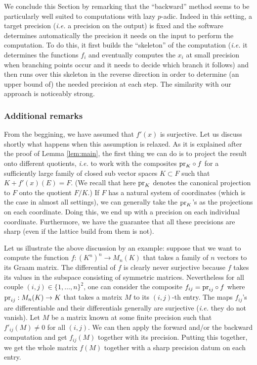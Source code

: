 \documentclass{lms}
\begin{document}
We conclude this Section by remarking that the ``backward'' method seems 
to be particularly well suited to computations with lazy $p$-adic. Indeed 
in this setting, a target precision (\emph{i.e.} a precision on the 
output) is fixed and the software determines automatically the precision 
it needs on the input to perform the computation. To do this, it first 
builds the ``skeleton'' of the computation (\emph{i.e.} it determines the 
functions $f_i$ and eventually computes the $x_i$ at small precision when 
branching points occur and it needs to decide which branch it follows) 
and then runs over this skeleton in the reverse direction in order to 
determine (an upper bound of) the needed precision at each step. The 
similarity with our approach is noticeably strong.

\subsubsection*{Additional remarks}

From the beggining, we have assumed that $f'(x)$ is surjective. Let us 
discuss shortly what happens when this assumption is relaxed. As it is 
explained after the proof of Lemma \ref{lem:main}, the first thing we 
can do is to project the result onto different quotients, \emph{i.e.} to 
work with the composites $\text{\rm pr}_K \circ f$ for a sufficiently large family 
of closed sub vector spaces $K \subset F$ such that $K + f'(x)(E) = F$. 
(We recall that here $\text{\rm pr}_K$ denotes the canonical projection to $F$ 
onto the quotient $F/K$.) If $F$ has a natural system of coordinates 
(which is the case in almost all settings), we can generally take the 
$\text{\rm pr}_K$'s as the projections on each coordinate. Doing this, we end up 
with a precision on each individual coordinate. Furthermore, we have the 
guarantee that all these precisions are sharp (even if the lattice build
from them is not).

Let us illustrate the above discussion by an example: suppose that we 
want to compute the function $f : (K^n)^n \to M_n(K)$ that takes a 
family of $n$ vectors to its Graam matrix. The differential of $f$ is
clearly never surjective because $f$ takes its values in the subspace
consisting of symmetric matrices. Nevertheless for all couple $(i,j)
\in \{1, \ldots, n\}^2$, one can consider the composite $f_{ij} = 
\text{\rm pr}_{ij} \circ f$ where $\text{\rm pr}_{ij} : M_n(K) \to K$ that takes a matrix 
$M$ to its $(i,j)$-th entry. The maps $f_{ij}$'s are differentiable and 
their differentials generally are surjective (\emph{i.e.} they do not 
vanish). Let $M$ be a matrix known at some finite precision such that 
$f'_{ij} (M) \neq 0$ for all $(i,j)$. We can then apply the forward 
and/or the backward computation and get $f_{ij}(M)$ together with its 
precision. Putting this together, we get the whole matrix $f(M)$ 
together with a sharp precision datum on each entry.
\end{document}
